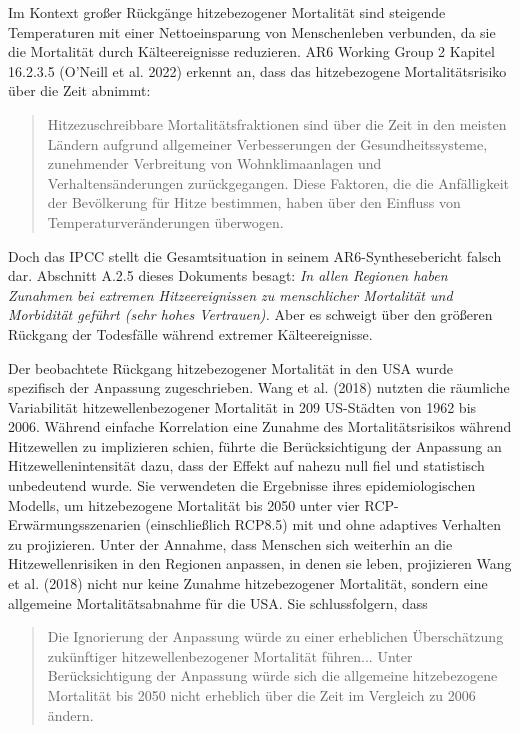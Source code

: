 \documentclass[12pt,paper=a4,DIV=12,parskip=never,chapterprefix=false,headings=standardclasses]{scrreprt}
\begin{document}
Im Kontext großer Rückgänge hitzebezogener Mortalität sind steigende Temperaturen mit einer Nettoeinsparung von Menschenleben verbunden, da sie die Mortalität durch Kälteereignisse reduzieren. AR6 Working Group 2 Kapitel 16.2.3.5 (O'Neill et al. 2022) erkennt an, dass das hitzebezogene Mortalitätsrisiko über die Zeit abnimmt:

\begin{quote}
Hitzezuschreibbare Mortalitätsfraktionen sind über die Zeit in den meisten Ländern aufgrund allgemeiner Verbesserungen der Gesundheitssysteme, zunehmender Verbreitung von Wohnklimaanlagen und Verhaltensänderungen zurückgegangen. Diese Faktoren, die die Anfälligkeit der Bevölkerung für Hitze bestimmen, haben über den Einfluss von Temperaturveränderungen überwogen.
\end{quote}

Doch das IPCC stellt die Gesamtsituation in seinem AR6-Synthesebericht falsch dar. Abschnitt A.2.5 dieses Dokuments besagt: \emph{In allen Regionen haben Zunahmen bei extremen Hitzeereignissen zu menschlicher Mortalität und Morbidität geführt (sehr hohes Vertrauen).} Aber es schweigt über den größeren Rückgang der Todesfälle während extremer Kälteereignisse.


Der beobachtete Rückgang hitzebezogener Mortalität in den USA wurde spezifisch der Anpassung zugeschrieben. Wang et al. (2018) nutzten die räumliche Variabilität hitzewellenbezogener Mortalität in 209 US-Städten von 1962 bis 2006. Während einfache Korrelation eine Zunahme des Mortalitätsrisikos während Hitzewellen zu implizieren schien, führte die Berücksichtigung der Anpassung an Hitzewellenintensität dazu, dass der Effekt auf nahezu null fiel und statistisch unbedeutend wurde. Sie verwendeten die Ergebnisse ihres epidemiologischen Modells, um hitzebezogene Mortalität bis 2050 unter vier RCP-Erwärmungsszenarien (einschließlich RCP8.5) mit und ohne adaptives Verhalten zu projizieren. Unter der Annahme, dass Menschen sich weiterhin an die Hitzewellenrisiken in den Regionen anpassen, in denen sie leben, projizieren Wang et al. (2018) nicht nur keine Zunahme hitzebezogener Mortalität, sondern eine allgemeine Mortalitätsabnahme für die USA. Sie schlussfolgern, dass

\begin{quote}
Die Ignorierung der Anpassung würde zu einer erheblichen Überschätzung zukünftiger hitzewellenbezogener Mortalität führen... Unter Berücksichtigung der Anpassung würde sich die allgemeine hitzebezogene Mortalität bis 2050 nicht erheblich über die Zeit im Vergleich zu 2006 ändern.
\end{quote}
\end{document}
